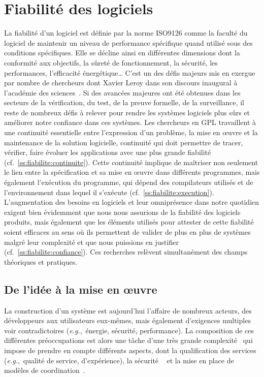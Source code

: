 \documentclass[11pt]{article}
\newcommand{\eg}[0]{\emph{e.g.},~}
\newcommand{\cf}[0]{cf.~}
\newcommand{\defi}[1]{\cite[défi]{#1}}
\begin{document}
\section{Fiabilité des logiciels\label{s:fiabilite}}
La fiabilité d'un logiciel est définie par la norme ISO9126 comme la faculté du logiciel de maintenir un niveau de performance spécifique quand utilisé sous des conditions spécifiques. Elle se décline ainsi en différentes dimensions dont la conformité aux objectifs, la sûreté de fonctionnement, la sécurité, les performances, l'efficacité énergétique\ldots 
C'est un des défis majeurs mis en exergue par nombre de chercheurs dont Xavier Leroy dans son discours inaugural à l'académie des sciences~\cite{leroy:hal-02370113}. Si des avancées majeures ont été obtenues dans les secteurs de la vérification, du test, de la preuve formelle, de la surveillance, il reste de nombreux défis à relever pour rendre les systèmes logiciels plus sûrs et améliorer notre confiance dans ces systèmes. 
Les chercheurs en GPL travaillent à une continuité essentielle entre l'expression d'un problème, la mise en {\oe}uvre et la maintenance de la solution logicielle, continuité qui doit permettre de tracer, vérifier, faire évoluer les applications avec une plus grande fiabilité (cf.~\ref{ss:fiabilite:continuite}). Cette continuité implique de maîtriser non seulement le lien entre la spécification et sa mise en  {\oe}uvre dans différents  programmes, mais également l'exécution du programme, qui dépend des compilateurs utilisés et de l'environnement dans lequel il s'exécute (\cf\ref{ss:fiabilite:execution}). 
L'augmentation des besoins en logiciels et leur omniprésence dans notre quotidien exigent bien évidemment que nous nous assurions de la fiabilité des logiciels produits, mais également que les éléments utilisés pour attester de cette fiabilité soient efficaces au sens où ils permettent de valider de plus en plus de systèmes malgré leur complexité et  que nous puissions en justifier (\cf\ref{ss:fiabilite:confiance}).
Ces recherches relèvent simultanément des champs théoriques et pratiques.


\subsection{De l'idée à la mise en {\oe}uvre\label{ss:fiabilite:continuite}} 
La construction d'un système est aujourd'hui l'affaire de nombreux acteurs, des développeurs aux utilisateurs eux-mêmes, mais également d'exigences multiples voir contradictoires (\eg énergie, sécurité, performance). La composition de ces différentes préoccupations est alors une tâche d'une très grande complexité~\defi{argumentation} qui impose de prendre en compte différents aspects, dont la qualification des services (\eg qualité de service, d'expérience), la sécurité
~\defi{securite} et la mise en place de modèles de coordination~\defi{reconfiguration}.
\end{document}
